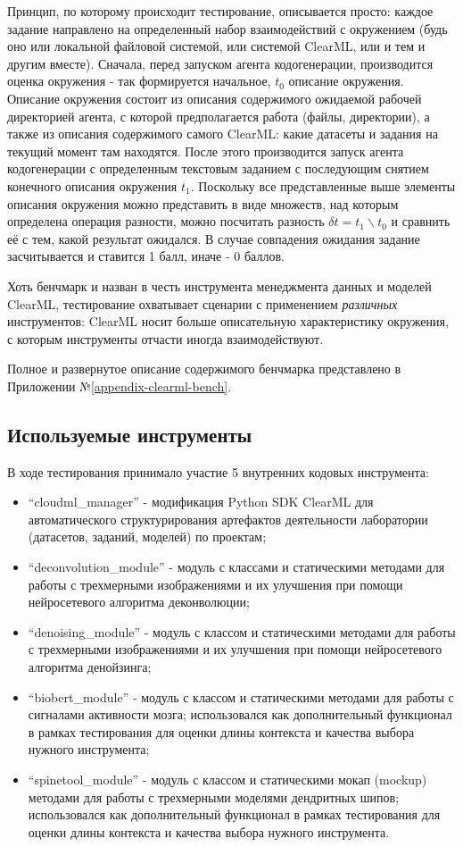 Принцип, по которому происходит тестирование, описывается просто: каждое задание направлено на 
определенный набор взаимодействий с окружением (будь оно или локальной файловой
системой, или системой ClearML, или и тем и другим вместе). 
Сначала, перед запуском агента кодогенерации, производится оценка окружения - 
так формируется начальное, $t_0$ описание окружения. 
Описание окружения состоит из описания содержимого ожидаемой рабочей директорией агента, 
с которой предполагается работа (файлы, директории), а также из описания содержимого самого ClearML: какие
датасеты и задания на текущий момент там находятся. После этого производится запуск
агента кодогенерации с определенным текстовым заданием с последующим снятием 
конечного описания окружения $t_1$. Поскольку все представленные выше элементы 
описания окружения можно представить в виде множеств, над которым определена операция разности, 
можно посчитать разность $\delta t = t_1 \backslash t_0$ и сравнить её с тем,
какой результат ожидался. В случае совпадения ожидания задание засчитывается и ставится 1 балл, 
иначе - 0 баллов.

Хоть бенчмарк и назван в честь инструмента менеджмента данных и моделей ClearML, 
тестирование охватывает сценарии с применением \textit{различных} инструментов: 
ClearML носит больше описательную характеристику окружения, 
с которым инструменты отчасти иногда взаимодействуют.

Полное и развернутое описание содержимого бенчмарка представлено в Приложении №\ref{appendix-clearml-bench}. 

\subsection{Используемые инструменты} \label{ch4:sec1:subsec2}
В ходе тестирования принимало участие
5 внутренних кодовых инструмента:
\begin{itemize}
    \item ``cloudml\_manager'' - модификация Python SDK ClearML для 
автоматического структурирования артефактов деятельности лаборатории (датасетов, заданий, 
моделей) по проектам;
    \item ``deconvolution\_module'' - модуль с классами и статическими методами 
для работы с трехмерными изображениями и их улучшения при помощи нейросетевого алгоритма деконволюции;
    \item ``denoising\_module'' - модуль с классом и статическими методами 
для работы с трехмерными изображениями и их улучшения при помощи нейросетевого алгоритма денойзинга;
    \item ``biobert\_module'' - модуль с классом и статическими методами для
работы с сигналами активности мозга; использовался как дополнительный функционал в рамках
тестирования для оценки длины контекста и качества выбора нужного инструмента;
    \item ``spinetool\_module'' - модуль с классом и статическими мокап (mockup) методами для
работы с трехмерными моделями дендритных шипов; использовался как дополнительный 
функционал в рамках тестирования для оценки длины контекста и 
качества выбора нужного инструмента. 
\end{itemize}


